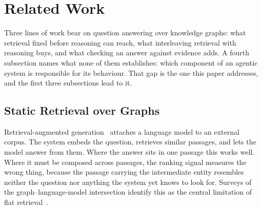 %
%
%

\section{Related Work}\label{sec:related}

Three lines of work bear on question answering over knowledge graphs:
what retrieval fixed before reasoning can reach, what interleaving
retrieval with reasoning buys, and what checking an answer against
evidence adds. A fourth subsection names what none of them establishes:
which component of an agentic system is responsible for its behaviour.
That gap is the one this paper addresses, and the first three
subsections lead to it.

\subsection{Static Retrieval over Graphs}\label{sec:rel-static}

Retrieval-augmented generation~\cite{lewis2020retrieval} attaches a
language model to an external corpus. The system embeds the question,
retrieves similar passages, and lets the model answer from them. Where
the answer sits in one passage this works well. Where it must be
composed across passages, the ranking signal measures the wrong thing,
because the passage carrying the intermediate entity resembles neither
the question nor anything the system yet knows to look for. Surveys of
the graph--language-model intersection identify this as the central
limitation of flat retrieval~\cite{li2023survey}.

